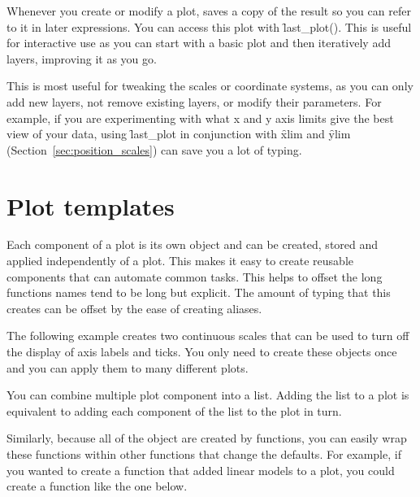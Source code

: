Whenever you create or modify a plot, \ggplot saves a copy of the result so you can refer to it in later expressions.  You can access this plot with \f{last_plot()}.  This is useful for interactive use as you can start with a basic plot and then iteratively add layers, improving it as you go.

This is most useful for tweaking the scales or coordinate systems, as you can only add new layers, not remove existing layers, or modify their parameters.  For example, if you are experimenting with what x and y axis limits give the best view of your data, using \f{last_plot} in conjunction with \f{xlim} and \f{ylim} (Section~\ref{sec:position_scales}) can save you a lot of typing.  

\section{Plot templates}
\label{sec:templates}

Each component of a \ggplot plot is its own object and can be created, stored and applied independently of a plot.  This makes it easy to create reusable components that can automate common tasks.  This helps to offset the long functions names tend to be long but explicit.  The amount of typing that this creates can be offset by the ease of creating aliases.

The following example creates two continuous scales that can be used to turn off the display of axis labels and ticks.  You only need to create these objects once and you can apply them to many different plots.

% 

You can combine multiple plot component into a list.  Adding the list to a plot is equivalent to adding each component of the list to the plot in turn.

Similarly, because all of the object are created by functions, you can easily wrap these functions within other functions that change the defaults.  For example, if you wanted to create a function that added linear models to a plot, you could create a function like the one below.

% 

